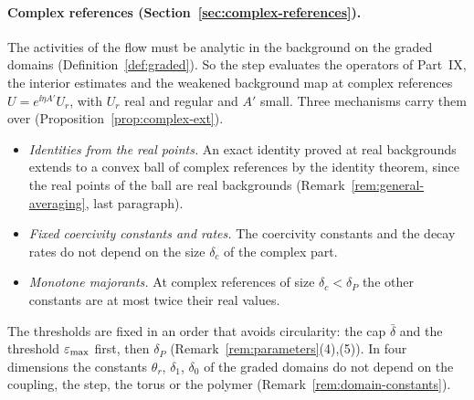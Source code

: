 \paragraph{Complex references (Section~\ref{sec:complex-references}).} The activities of the flow must be analytic in the background on the graded domains (Definition~\ref{def:graded}). So the step evaluates the operators of Part~IX, the interior estimates and the weakened background map at complex references $U=e^{\ii\eta A'}U_r$, with $U_r$ real and regular and $A'$ small. Three mechanisms carry them over (Proposition~\ref{prop:complex-ext}).
\begin{itemize}
\item \emph{Identities from the real points.} An exact identity proved at real backgrounds extends to a convex ball of complex references by the identity theorem, since the real points of the ball are real backgrounds (Remark~\ref{rem:general-averaging}, last paragraph).
\item \emph{Fixed coercivity constants and rates.} The coercivity constants and the decay rates do not depend on the size $\delta_c$ of the complex part.
\item \emph{Monotone majorants.} At complex references of size $\delta_c<\delta_P$ the other constants are at most twice their real values.
\end{itemize}
The thresholds are fixed in an order that avoids circularity: the cap $\bar\delta$ and the threshold $\varepsilon_{\max}$ first, then $\delta_P$ (Remark~\ref{rem:parameters}(4),(5)). In four dimensions the constants $\theta_r$, $\delta_1$, $\delta_0$ of the graded domains do not depend on the coupling, the step, the torus or the polymer (Remark~\ref{rem:domain-constants}).

